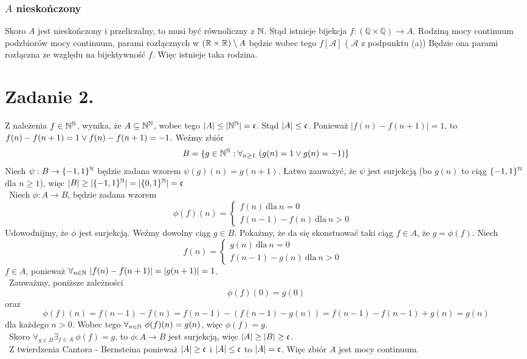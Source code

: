 \documentclass{article}
\begin{document}
\subsubsection*{$A$ nieskończony}
Skoro $A$ jest nieskończony i przeliczalny, to musi być równoliczny z $\mathbb{N}$. Stąd istnieje bijekcja $f:(\mathbb{Q} \times \mathbb{Q}) \rightarrow A$. Rodziną mocy continuum podzbiorów mocy continuum, parami rozłącznych w $(\mathbb{R} \times \mathbb{R}) \setminus A$ będzie wobec tego $f[\mathcal{A}]$ ( $\mathcal{A}$ z podpunktu (a)) Będzie ona parami rozłączna ze względu na bijektywność $f$. Więc istnieje taka rodzina.
\section*{Zadanie 2.}
Z należenia $f\in \mathbb{N}^{\mathbb{N}}$, wynika, że $A \subseteq \mathbb{N}^{\mathbb{N}}$, wobec tego $\vert A \vert \leq \vert \mathbb{N} ^ {\mathbb{N}} \vert = \mathfrak{c}  $. Stąd $\vert A \vert \leq \mathfrak{c}$. Ponieważ $\vert f(n)- f(n+1)\vert = 1$, to $f(n) - f(n+1) = 1 \vee f(n) - f(n+1) = -1$.
Weźmy zbiór \[B = \{g \in \mathbb{N} ^ {\mathbb{N}}: \forall_{n\geq 1} \ (g(n) = 1 \vee g(n)= -1)  \}\]
Niech $\psi: B \rightarrow \{-1,1\}^{\mathbb{N}}$ będzie zadana wzorem $\psi(g)(n) = g(n+1)$. Łatwo zauważyć, że $\psi$ jest surjekcją (bo $g(n)$ to ciąg $\{-1,1\}^{\mathbb{N}}$ dla $n\geq 1$), więc    
$\vert B \vert \geq \vert \{-1,1\}^{\mathbb{N}} \vert = \vert \{0,1\}^{\mathbb{N}} \vert = \mathfrak{c} $\\\
Niech $\phi: A \rightarrow B$, będzie zadana wzorem \[\phi(f)(n) = \left\{\begin{array}{cc} f(n)
     \ \mbox{dla} \  n = 0  &  \\
     f(n-1)-f(n) \ \mbox{dla} \ n>0 & 
\end{array}\right.\]
Udowodnijmy, że $\phi$ jest surjekcją.  Weźmy dowolny ciąg $g \in B$. Pokażmy, że da się skonstuować taki ciąg $f \in A$, że $ g = \phi(f)$. Niech \[f(n) = \left\{\begin{array}{cc} g(n)
     \ \mbox{dla} \  n = 0  &  \\
     f(n-1)-g(n) \ \mbox{dla} \ n>0 & 
\end{array}\right.\] 
$f\in A$, ponieważ $\forall_{n \in \mathbb{N}} \  \vert f(n) - f(n+1) \vert = \vert g(n+1) \vert = 1$. \\\
Zauważmy, poniższe zależności \[\phi(f)(0) = g(0)\] oraz \[\phi(f)(n) =f(n-1) - f(n) =f(n-1) - (f(n-1) - g(n))= f(n-1) - f(n-1) + g(n) = g(n)\] dla każdego $n>0$. Wobec tego $\forall_{n \in \mathbb{N}} \ \phi(f)(n) = g(n)$, więc $\phi(f) = g$.\\\ Skoro $\forall_{g \in B} \exists_{f \in A} \ \phi(f) = g$, to $\phi: A \rightarrow B$ jest surjekcją, więc $\vert A \vert \geq \vert B \vert \geq \mathfrak{c}$. \\\
Z twierdzenia Cantora - Bernsteina ponieważ 
$\vert A \vert \geq  \mathfrak{c}$ i $\vert A \vert \leq  \mathfrak{c}$ to $\vert A \vert =  \mathfrak{c}$. Więc zbiór $A$ jest mocy continuum.
\end{document}
